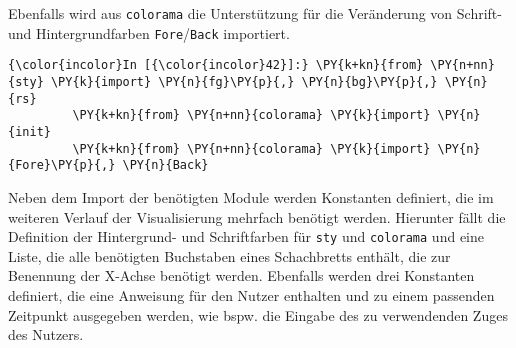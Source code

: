 Ebenfalls wird aus \texttt{colorama} die Unterstützung für die
Veränderung von Schrift- und Hintergrundfarben
\texttt{Fore}/\texttt{Back} importiert.

    \begin{Verbatim}[commandchars=\\\{\}]
{\color{incolor}In [{\color{incolor}42}]:} \PY{k+kn}{from} \PY{n+nn}{sty} \PY{k}{import} \PY{n}{fg}\PY{p}{,} \PY{n}{bg}\PY{p}{,} \PY{n}{rs}
         \PY{k+kn}{from} \PY{n+nn}{colorama} \PY{k}{import} \PY{n}{init}
         \PY{k+kn}{from} \PY{n+nn}{colorama} \PY{k}{import} \PY{n}{Fore}\PY{p}{,} \PY{n}{Back}
\end{Verbatim}

    Neben dem Import der benötigten Module werden Konstanten definiert, die
im weiteren Verlauf der Visualisierung mehrfach benötigt werden.
Hierunter fällt die Definition der Hintergrund- und Schriftfarben für
\texttt{sty} und \texttt{colorama} und eine Liste, die alle benötigten
Buchstaben eines Schachbretts enthält, die zur Benennung der X-Achse
benötigt werden. Ebenfalls werden drei Konstanten definiert, die eine
Anweisung für den Nutzer enthalten und zu einem passenden Zeitpunkt
ausgegeben werden, wie bspw. die Eingabe des zu verwendenden Zuges des
Nutzers.

